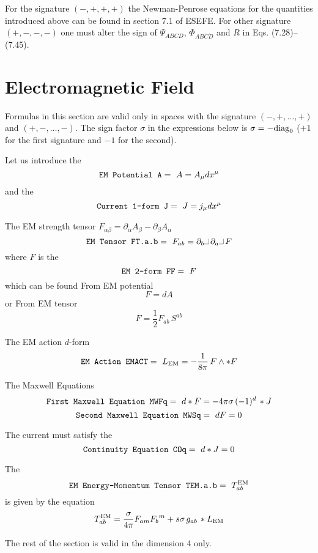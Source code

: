 \documentclass[twoside,openright]{report}
\newcommand{\grgtt}{\ttfamily}
\newcommand{\object}[2]{%
\begin{equation}
\mbox{\comm{#1}} =\ #2
\end{equation}}
\newcommand{\ipr}{\rule{1.8mm}{.1mm}\rule{.1mm}{2.2mm}\,} %
\renewcommand{\tt}{\grgtt}
\newcommand{\comm}[1]{{\upshape\tt#1}}    %
\begin{document}
For the signature ${\scriptstyle(-,+,+,+)}$ the Newman-Penrose equations for
the quantities introduced above can be found in section 7.1 of ESEFE.
For other signature ${\scriptstyle(+,-,-,-)}$ one must alter the sign of
$\Psi_{ABCD}$, $\Phi_{AB\dot{C}\dot{D}}$ and $R$ in Eqs. (7.28)--(7.45).

\section{Electromagnetic Field}

Formulas in this section are valid only in spaces
with the signature ${\scriptstyle(-,+,\dots,+)}$ and
${\scriptstyle(+,-,\dots,-)}$.
The sign factor $\sigma$ in the expressions below is
$\sigma=-{\rm diag}_0$ ($+1$ for the first signature and $-1$
for the second).

Let us introduce the
\object{EM Potential A}{A=A_\mu dx^\mu}
and the
\object{Current 1-form     J}{J=j_\mu dx^\mu}

The EM strength tensor
$F_{\alpha\beta}=\partial_\alpha A_\beta-\partial_\beta A_\alpha$
\object{EM Tensor  FT.a.b}{F_{ab}=
\partial_b\ipr\partial_a\ipr F}
where $F$ is the
\object{EM 2-form FF}{F}
which can be found {\tt From EM potential}
\begin{equation}
F=dA
\end{equation}
or {\tt From EM tensor}
\begin{equation}
F = \frac{1}{2}F_{ab}\,S^{ab}
\end{equation}

The EM action $d$-form
\object{EM Action EMACT}{L_{\rm EM}=
-\frac{1}{8\pi}\,F\wedge *F}

The {\tt Maxwell Equations}
\object{First Maxwell Equation MWFq}{d*F=-4\pi\sigma\,(-1)^{d}\,*J}
\object{Second Maxwell Equation MWSq}{dF=0}

The current must satisfy the
\object{Continuity Equation  COq}{d*J=0}

The
\object{EM Energy-Momentum Tensor  TEM.a.b}{T_{ab}^{\rm EM}}
is given by the equation
\begin{equation}
T^{\rm EM}_{ab} = \frac{\sigma}{4\pi}
F_{am}F_b{}^m +s\sigma\,g_{ab}\,*L_{\rm EM}
\end{equation}

The rest of the section is valid in the dimension 4 only.
\end{document}
